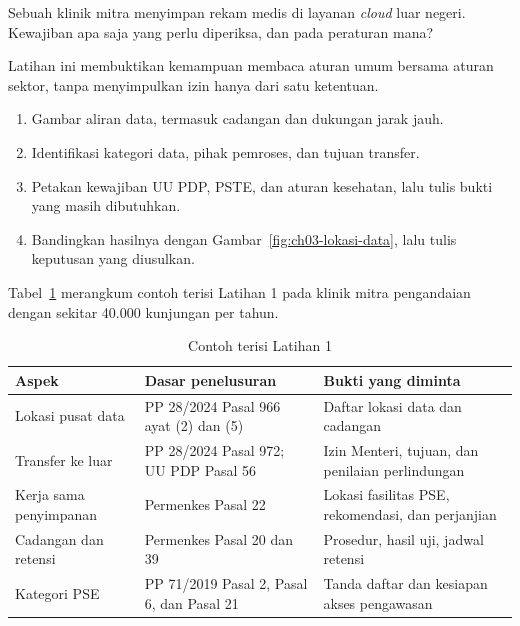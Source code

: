 Sebuah klinik mitra menyimpan rekam medis di layanan \textit{cloud} luar negeri. Kewajiban apa saja yang perlu diperiksa,
dan pada peraturan mana?

Latihan ini membuktikan kemampuan membaca aturan umum bersama aturan sektor, tanpa menyimpulkan izin hanya dari satu
ketentuan.
\begin{enumerate}
  \item Gambar aliran data, termasuk cadangan dan dukungan jarak jauh.
  \item Identifikasi kategori data, pihak pemroses, dan tujuan transfer.
  \item Petakan kewajiban UU PDP, PSTE, dan aturan kesehatan, lalu tulis bukti yang masih dibutuhkan.
  \item Bandingkan hasilnya dengan Gambar~\ref{fig:ch03-lokasi-data}, lalu tulis keputusan yang diusulkan.
\end{enumerate}

Tabel~\ref{tab:ch03-lat1-contoh} merangkum contoh terisi Latihan 1 pada klinik mitra pengandaian dengan sekitar 40.000
kunjungan per tahun.
\begin{table}[!htb]
  \centering\small
  \caption{Contoh terisi Latihan 1}\label{tab:ch03-lat1-contoh}
  \begin{tabularx}{\textwidth}{|>{\raggedright\arraybackslash}p{}|>{\raggedright\arraybackslash}X|>{\raggedright\arraybackslash}X|}
    \hline
    \textbf{Aspek} & \textbf{Dasar penelusuran} & \textbf{Bukti yang diminta} \\ \hline
    Lokasi pusat data & PP 28/2024 Pasal 966 ayat (2) dan (5) & Daftar lokasi data dan cadangan \\ \hline
    Transfer ke luar & PP 28/2024 Pasal 972; UU PDP Pasal 56 & Izin Menteri, tujuan, dan penilaian perlindungan \\
    \hline
    Kerja sama penyimpanan & Permenkes Pasal 22 & Lokasi fasilitas PSE, rekomendasi, dan perjanjian \\ \hline
    Cadangan dan retensi & Permenkes Pasal 20 dan 39 & Prosedur, hasil uji, jadwal retensi \\ \hline
    Kategori PSE & PP 71/2019 Pasal 2, Pasal 6, dan Pasal 21 & Tanda daftar dan kesiapan akses pengawasan \\ \hline
  \end{tabularx}
\end{table}

